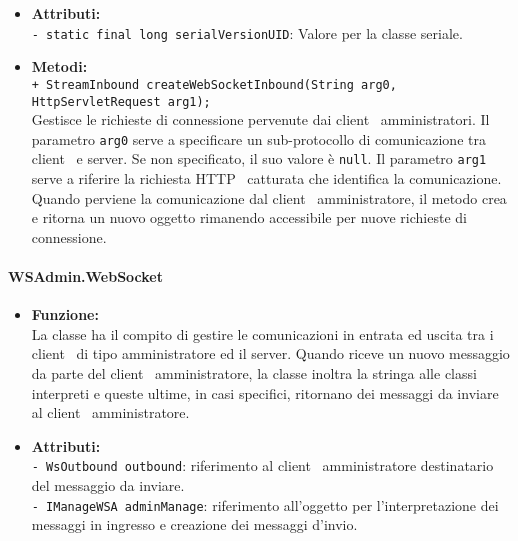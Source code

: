 {{\begin{sloppypar}
{{{\begin{itemize}
				\item[] \textbf{Attributi:}\\
					\texttt{- static final long serialVersionUID}: Valore per la classe seriale.\\
			
				\item[] \textbf{Metodi:}{\\
				\texttt{+ StreamInbound createWebSocketInbound(String arg0, HttpServletRequest arg1);}\\
					Gestisce le richieste di connessione pervenute dai client\g~ amministratori.
					Il parametro \texttt{arg0} serve a specificare un sub-protocollo di comunicazione tra client\g~ e server\g. Se non specificato, il suo valore è \texttt{null}.
					Il parametro \texttt{arg1} serve a riferire la richiesta HTTP\g~ catturata che identifica la comunicazione.
					Quando perviene la comunicazione dal client\g~ amministratore, il metodo crea e ritorna un nuovo oggetto  rimanendo accessibile per nuove richieste di connessione.\\
				}
			\end{itemize}
		}
		
		

		\paragraph{WSAdmin.WebSocket}\label{par:WSAdminWebSocket}{
			\begin{itemize}

				\item[] \textbf{Funzione:}{\\
					La classe ha il compito di gestire le comunicazioni in entrata ed uscita tra i client\g~ di tipo amministratore ed il server\g.
					Quando riceve un nuovo messaggio da parte del client\g~ amministratore, la classe inoltra la stringa alle classi interpreti e queste ultime, in casi specifici, ritornano dei messaggi da inviare al client\g~ amministratore.\\
				 }
				
				\item[] \textbf{Attributi:}\\
					\texttt{- WsOutbound outbound}: riferimento al client\g~ amministratore destinatario del messaggio da inviare.\\
					
					\texttt{- IManageWSA adminManage}: riferimento all'oggetto  per l'interpretazione dei messaggi in ingresso e creazione dei messaggi d'invio.\\
			

\end{itemize}}}}
\end{sloppypar}}}
